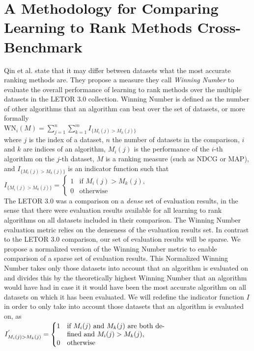 \documentclass{llncs}
\begin{document}
\section{A Methodology for Comparing Learning to Rank Methods Cross-Benchmark}
Qin et al. \cite{Qin2010} state that it may differ between datasets what the most accurate ranking methods are. They propose a measure they call \emph{Winning Number} to evaluate the overall performance of learning to rank methods over the multiple datasets in the LETOR 3.0 collection. Winning Number is defined as the number of other algorithms that an algorithm can beat over the set of datasets, or more formally\\
$\mbox{WN}_i(M) = \sum\nolimits_{j=1}^n \sum\nolimits_{k=1}^m I_{\{M_i(j)>M_k(j)\}}$\\
where $j$ is the index of a dataset, $n$ the number of datasets in the comparison, $i$ and $k$ are indices of an algorithm, $M_i(j)$ is the performance of the $i$-th algorithm on the $j$-th dataset, $M$ is a ranking measure (such as NDCG or MAP), and $I_{\{M_i(j)>M_k(j)\}}$ is an indicator function such that\\
$I_{\{M_i(j)>M_k(j)\}} = \begin{cases}
1 & \mbox{if } M_i(j) > M_k(j), \\
0 & \mbox{otherwise}
\end{cases}$\\
The LETOR 3.0 was a comparison on a \emph{dense} set of evaluation results, in the sense that there were evaluation results available for all learning to rank algorithms on all datasets included in their comparison. The Winning Number evaluation metric relies on the denseness of the evaluation results set. In contrast to the LETOR 3.0 comparison, our set of evaluation results will be sparse. We propose a normalized version of the Winning Number metric to enable comparison of a sparse set of evaluation results. This Normalized Winning Number takes only those datasets into account that an algorithm is evaluated on and divides this by the theoretically highest Winning Number that an algorithm would have had in case it it would have been the most accurate algorithm on all datasets on which it has been evaluated. We will redefine the indicator function $I$ in order to only take into account those datasets that an algorithm is evaluated on, as\\
$I^{'}_{M_i(j)>M_k(j)} = \begin{cases}
1 & \parbox[t]{5cm}{if $M_i(j)$ and $M_k(j)$ are both defined and $M_i(j) > M_k(j)$,}\\
0 & \parbox[t]{5cm}{otherwise}
\end{cases}$\\
\end{document}
